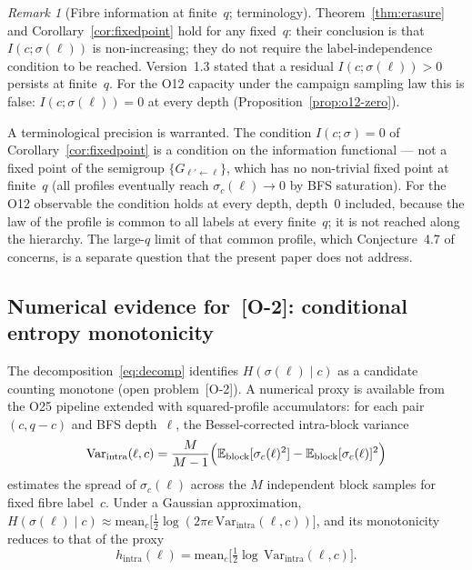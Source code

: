 \documentclass[11pt,a4paper]{article}
\theoremstyle{plain}
\theoremstyle{definition}
\theoremstyle{remark}
\newtheorem{remark}[theorem]{Remark}
\begin{document}
    \begin{remark}[Fibre information at finite~$q$; terminology]
      \label{rem:fixedpoint-thermo}
      Theorem~\ref{thm:erasure} and Corollary~\ref{cor:fixedpoint} hold for any fixed~$q$:
      their conclusion is that $I(c;\sigma(\ell))$ is non-increasing; they do not require
      the label-independence condition to be reached.
      Version~1.3 stated that a residual $I(c;\sigma(\ell)) > 0$ persists at finite~$q$.
      For the O12 capacity under the campaign sampling law this is false:
      $I(c;\sigma(\ell)) = 0$ at every depth (Proposition~\ref{prop:o12-zero}).

      A terminological precision is warranted.
      The condition $I(c;\sigma) = 0$ of Corollary~\ref{cor:fixedpoint} is a condition on the
      information functional ---
      not a fixed point of the semigroup $\{G_{\ell' \leftarrow \ell}\}$,
      which has no non-trivial fixed point at finite~$q$
      (all profiles eventually reach $\sigma_c(\ell) \to 0$ by BFS saturation).
      For the O12 observable the condition holds at every depth, depth~$0$ included, because the
      law of the profile is common to all labels at every finite~$q$; it is not reached along the
      hierarchy. The large-$q$ limit of that common profile, which Conjecture~4.7
      of~\cite{Beau2026q5b} concerns, is a separate question that the present paper does not
      address.
    \end{remark}

    \clearpage
  \subsection{Numerical evidence for~\textup{[O-2]}: conditional entropy monotonicity}
  \label{sec:o2-test}

  The decomposition~\eqref{eq:decomp} identifies $H(\sigma(\ell) \mid c)$
  as a candidate counting monotone (open problem~\textup{[O-2]}).
  A numerical proxy is available from the O25 pipeline
  extended with squared-profile accumulators:
  for each pair $(c, q-c)$ and BFS depth~$\ell$,
  the Bessel-corrected intra-block variance
  \begin{equation}
    \label{eq:varintra}
    \mathrm{Var}_{\mathrm{intra}}(\ell, c)
    = \frac{M}{M-1}
    \Bigl(
    \mathbb{E}_{\mathrm{block}}[\sigma_c(\ell)^2]
    - \mathbb{E}_{\mathrm{block}}[\sigma_c(\ell)]^2
    \Bigr)
  \end{equation}
  estimates the spread of $\sigma_c(\ell)$ across the $M$ independent block samples
  for fixed fibre label~$c$.
  Under a Gaussian approximation,
  $H(\sigma(\ell) \mid c)
  \approx \mathrm{mean}_c\bigl[\frac{1}{2}\log(2\pi e\,\mathrm{Var}_{\mathrm{intra}}(\ell, c))\bigr]$,
  and its monotonicity reduces to that of the proxy
  \begin{equation}
    \label{eq:hintra}
    h_{\mathrm{intra}}(\ell)
    = \mathrm{mean}_c\!\bigl[\tfrac{1}{2}\log\,\mathrm{Var}_{\mathrm{intra}}(\ell, c)\bigr].
  \end{equation}
\end{document}
